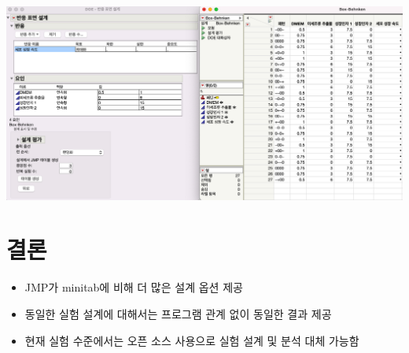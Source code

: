 \documentclass{article}
\begin{document}
    \includegraphics[scale=0.3]{boxbenhken.png}
    \section{결론}
    \begin{itemize}
        \item JMP가 minitab에 비해 더 많은 설계 옵션 제공
        \item 동일한 실험 설계에 대해서는 프로그램 관계 없이 동일한 결과 제공
        \item 현재 실험 수준에서는 오픈 소스 사용으로 실험 설계 및 분석 대체 가능함
    \end{itemize}
\end{document}
